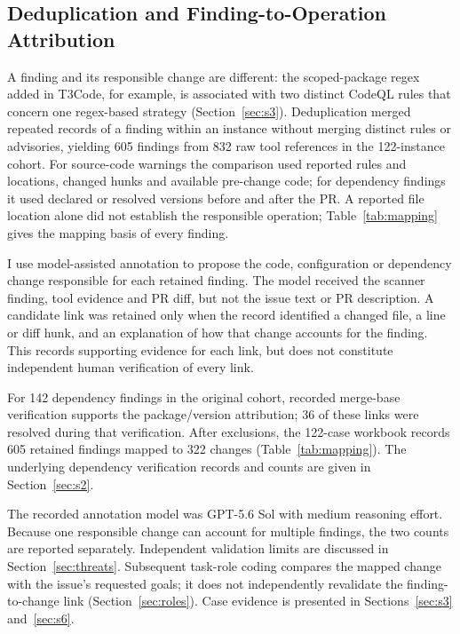 \documentclass[acmsmall,screen,nonacm]{acmart}
\begin{document}
\subsection{Deduplication and Finding-to-Operation Attribution}\label{sec:attrib}

A finding and its responsible change are different: the scoped-package regex added in T3Code, for example, is associated with two distinct CodeQL rules that concern one regex-based strategy (Section~\ref{sec:s3}). Deduplication merged repeated records of a finding within an instance without merging distinct rules or advisories, yielding 605 findings from 832 raw tool references in the 122-instance cohort. For source-code warnings the comparison used reported rules and locations, changed hunks and available pre-change code; for dependency findings it used declared or resolved versions before and after the PR. A reported file location alone did not establish the responsible operation; Table~\ref{tab:mapping} gives the mapping basis of every finding.

I use model-assisted annotation to propose the code, configuration or dependency change responsible for each retained finding. The model received the scanner finding, tool evidence and PR diff, but not the issue text or PR description. A candidate link was retained only when the record identified a changed file, a line or diff hunk, and an explanation of how that change accounts for the finding. This records supporting evidence for each link, but does not constitute independent human verification of every link.

For 142 dependency findings in the original cohort, recorded merge-base verification supports the package/version attribution; 36 of these links were resolved during that verification. After exclusions, the 122-case workbook records 605 retained findings mapped to 322 changes (Table~\ref{tab:mapping}). The underlying dependency verification records and counts are given in Section~\ref{sec:s2}.

The recorded annotation model was GPT-5.6 Sol with medium reasoning effort. Because one responsible change can account for multiple findings, the two counts are reported separately. Independent validation limits are discussed in Section~\ref{sec:threats}. Subsequent task-role coding compares the mapped change with the issue's requested goals; it does not independently revalidate the finding-to-change link (Section~\ref{sec:roles}). Case evidence is presented in Sections~\ref{sec:s3} and~\ref{sec:s6}.
\end{document}
